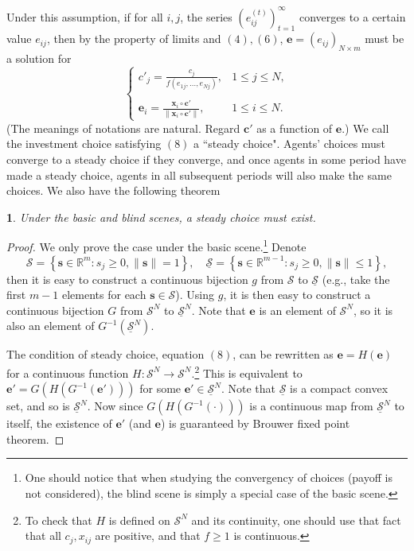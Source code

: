 \documentclass[12pt,english]{article}
\theoremstyle{plain}
\theoremstyle{plain}
\newtheorem{thm}{\protect\theoremname}
\providecommand{\theoremname}{Theorem}
\begin{document}
	Under this assumption, if for all $i, j$, the series $\left(e_{ij}^{(t)}\right)_{t = 1}^{\infty}$ converges to a certain value $e_{ij}$, then by the property of limits and $(4), (6)$, $\mathbf{e} = (e_{ij})_{N\times m}$ must be a solution for
	\begin{equation}
	\left\{
	\begin{matrix}\displaystyle
	c'_j = \frac{c_j}{f\left(e_{1j},\dots, e_{Nj}\right)},& 1\leqslant j\leqslant N,
	\\\quad\\\displaystyle
	\mathbf{e}_i = \frac{\mathbf{x}_i\circ \mathbf{c}'}{\lVert\mathbf{x}_i\circ \mathbf{c}'\rVert},&  1\leqslant i\leqslant N.
	\end{matrix}
	\right.
	\end{equation}
	(The meanings of notations are natural. Regard $\mathbf{c'}$ as a function of $\mathbf{e}$.)
	We call the investment choice satisfying $(8)$ a ``steady choice". Agents' choices must converge to a steady choice if they converge, and once agents in some period have made a steady choice, agents in all subsequent periods will also make the same choices. We also have the following theorem\par
	
	\begin{thm}
		Under the basic and blind scenes, a steady choice must exist.
	\end{thm}
	\begin{proof}
		We only prove the case under the basic scene.\footnote{One should notice that when studying the convergency of choices (payoff is not considered), the blind scene is simply a special case of the basic scene.}
		Denote $$\mathcal{S} =  \left\{\mathbf{s}\in \mathbb{R}^m: s_j \geqslant0, \lVert \mathbf{s}\rVert = 1 \right\},\quad \mathcal{\underline{S}} =  \left\{\mathbf{s}\in \mathbb{R}^{m - 1}: s_j \geqslant0, \lVert \mathbf{s}\rVert \leqslant 1 \right\},$$ 
		then it is easy to construct a continuous bijection $g$ from $\mathcal{S}$ to $\mathcal{\underline{S}}$ (e.g., take the first $m - 1$ elements for each $\mathbf{s} \in \mathcal{S}$). Using $g$, it is then easy to construct a continuous bijection $G$ from $\mathcal{S}^N$ to $\mathcal{\underline{S}}^N$.  Note that $\mathbf{e}$ is an element of $\mathcal{S}^{N}$, so it is also an element of $G^{-1}(\mathcal{\underline{S}}^N)$. \par
		
		The condition of steady choice, equation $(8)$, can be rewritten as $\mathbf{e} = H(\mathbf{e})$ for a continuous function $H: \mathcal{S}^N\to \mathcal{S}^N$.\footnote{To check that $H$ is defined on $\mathcal{S}^N$ and its continuity, one should use that fact that all $c_j, x_{ij}$ are positive, and that $f \geqslant 1$ is continuous.} This is equivalent to $\mathbf{e}' = G(H(G^{-1}(\mathbf{e}')))$ for some $\mathbf{e}'\in \mathcal{\underline{S}}^N$. Note that $\mathcal{\underline{S}}$ is a compact convex set, and so is $\mathcal{\underline{S}}^N$. Now since $G(H(G^{-1}(\cdot)))$ is a continuous map from $\mathcal{\underline{S}}^N$ to itself, the existence of $\mathbf{e}'$ (and $\mathbf{e}$) is guaranteed by Brouwer fixed point theorem.
	\end{proof}
	
\end{document}

